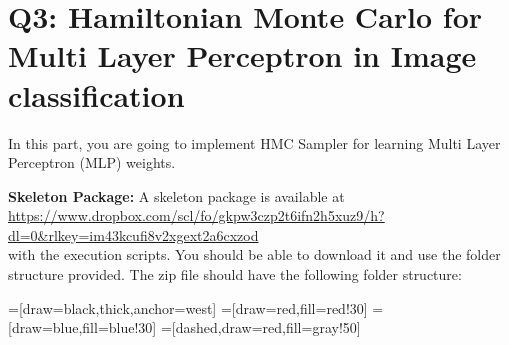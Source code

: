 
\section{Q3: Hamiltonian Monte Carlo for Multi Layer Perceptron in Image classification} In this part, you are going to implement HMC Sampler for learning Multi Layer Perceptron (MLP) weights.
%

%
\hfill

%
\noindent \textbf{Skeleton Package:}
%
A skeleton package is available at \\
\url{https://www.dropbox.com/scl/fo/gkpw3czp2t6ifn2h5xuz9/h?dl=0&rlkey=im43kcufi8v2xgext2a6cxzod}\\
 with the execution scripts.
%
You should be able to download it and use the folder structure provided.
%
%
\noindent The zip file should have the following folder structure:

%
=[draw=black,thick,anchor=west]
=[draw=red,fill=red!30]
=[draw=blue,fill=blue!30]
=[dashed,draw=red,fill=gray!50]
%

%
\hfill

